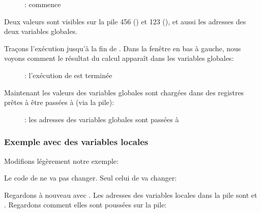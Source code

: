 \begin{figure}[H]
\centering
{}
\caption{\olly: \ttfone commence}
\label{fig:pointers_olly_global_2}
\end{figure}

Deux valeurs sont visibles sur la pile 456 () et 123 (), et aussi
les adresses des deux variables globales.

\clearpage
Traçons l'exécution jusqu'à la fin de \ttfone.
Dans la fenêtre en bas à gauche, nous voyons comment le résultat du calcul apparaît
dans les variables globales:

\begin{figure}[H]
\centering
{}
\caption{\olly: l'exécution de \ttfone est terminée}
\label{fig:pointers_olly_global_3}
\end{figure}

\clearpage

Maintenant les valeurs des variables globales sont chargées dans des registres prêtes
à être passées à \printf (via la pile):

\begin{figure}[H]
\centering
{}
\caption{\olly: 
les adresses des variables globales sont passées à \printf}
\label{fig:pointers_olly_global_4}
\end{figure}

\subsubsection{Exemple avec des variables locales}

Modifions légèrement notre exemple:



Le code de \ttfone ne va pas changer.
Seul celui de \main va changer:



\newcommand{\PtrsAddresses}{\TT{0x2EF854} et \TT{0x2EF858}\xspace}

\clearpage
Regardons à nouveau avec \olly.
Les adresses des variables locales dans la pile sont \PtrsAddresses.
Regardons comment elles sont poussées sur la pile:

